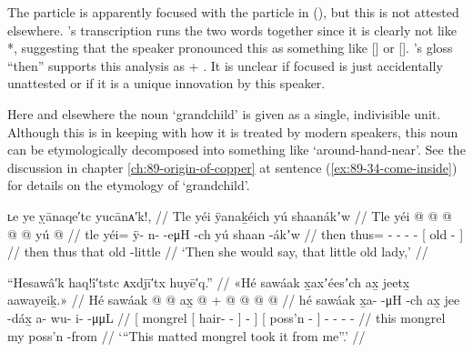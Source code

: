 The particle  is apparently focused with the particle  in (\lastx), but this is not attested elsewhere.
\citeauthor{swanton:1909}’s transcription  runs the two words together since it is clearly not like *, suggesting that the speaker pronounced this as something like [] or [].
\citeauthor{swanton:1909}’s gloss “then” supports this analysis as  + .
It is unclear if focused  is just accidentally unattested or if it is a unique innovation by this speaker.

Here and elsewhere the noun  ‘grandchild’ is given as a single, indivisible unit.
Although this is in keeping with how it is treated by modern speakers, this noun can be etymologically decomposed into something like  ‘around-hand-near’.
See the discussion in chapter \ref{ch:89-origin-of-copper} at sentence (\ref{ex:89-34-come-inside}) for details on the etymology of  ‘grandchild’.

\ex\label{ex:92-11-little-old-lady-would-say}%
%
\begingl
	\glpreamble	ʟe ye ỵānaqe′tc yucānᴀ′k!, //
	\glpreamble	Tle yéi ÿanaḵéich yú shaanákʼw //
	\gla	Tle yéi @  @ {} @ {} @ {} @ {}
		{} yú  @ {} {} //
	\glb	tle yéi= ÿ- n-  -eμH -ch
		{} yú shaan -ákʼw {} //
	\glc	then thus= - -  - -
		{}[  old - {}] //
	\gld	then thus  {} {} {} {} 
		{} that old -little {} //
	\glft	‘Then she would say, that little old lady,’
		//
\endgl
\xe

\ex\label{ex:92-12-mangy-mutt-took-from-me}%
%
\begingl
	\glpreamble	“Hesawâ′k haq!î′tstc ᴀxdjī′tx huyē′q.” //
	\glpreamble	«\!Hé sawáak x̱axʼéesʼch ax̱ jeetx̱ aawayeiḵ.\!» //
	\gla	{} Hé sawáak {}  @ {} @ {} {} {} {}
		{} ax̱  @ {} {} +
		 @ {} @ {} @ {} @ {} //
	\glb	{} hé sawáak {} x̱a-  -μH {} -ch {}
		{} ax̱ jee -dáx̱ {}
		a- wu- i-  -μμL //
	\glc	{}[  mongrel
			{}[ hair-  - {}] - {}]
		{}[  poss’n - {}]
		 - - -  - //
	\gld	{} this mongrel {}  {} {} {} {} {}
		{} my poss’n -from {}
		 {} {} {} {} //
	\glft	‘“This matted mongrel took it from me”.’
		//
\endgl
\xe

